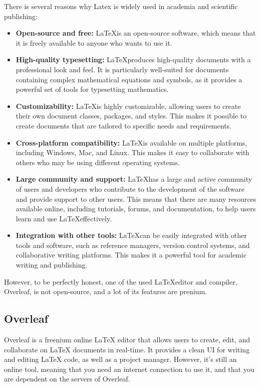 There is several reasons why Latex is widely used in academia and scientific publishing:
\begin{itemize}
  \item \textbf{Open-source and free:} \LaTeX is an open-source software, which means that it is freely available to anyone who wants to use it. 
  \item \textbf{High-quality typesetting:} \LaTeX produces high-quality documents with a professional look and feel. It is particularly well-suited for documents containing complex mathematical equations and symbols, as it provides a powerful set of tools for typesetting mathematics.
  \item \textbf{Customizability:} \LaTeX is highly customizable, allowing users to create their own document classes, packages, and styles. This makes it possible to create documents that are tailored to specific needs and requirements.
  \item \textbf{Cross-platform compatibility:} \LaTeX is available on multiple platforms, including Windows, Mac, and Linux. This makes it easy to collaborate with others who may be using different operating systems.
  \item \textbf{Large community and support:} \LaTeX has a large and active community of users and developers who contribute to the development of the software and provide support to other users. This means that there are many resources available online, including tutorials, forums, and documentation, to help users learn and use \LaTeX effectively.
  \item \textbf{Integration with other tools:} \LaTeX can be easily integrated with other tools and software, such as reference managers, version control systems, and collaborative writing platforms. This makes it a powerful tool for academic writing and publishing.
\end{itemize}

However, to be perfectly honest, one of the used \LaTeX editor and compiler, Overleaf, is not open-source, and a lot of its features are prenium.

\subsection{Overleaf}

Overleaf is a freenium online LaTeX editor that allows users to create, edit, and collaborate on LaTeX documents in real-time. It provides a clean UI for writing and editing LaTeX code, as well as a project manager. However, it's still an online tool, meaning that you need an internet connection to use it, and that you are dependent on the servers of Overleaf.
